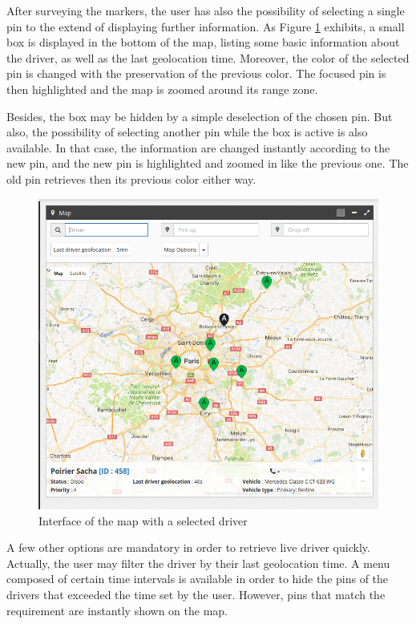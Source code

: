 After surveying the markers, the user has also the possibility of selecting a single pin to the extend of displaying further information. As Figure \ref{int7} exhibits, a small box is displayed in the bottom of the map, listing some basic information about the driver, as well as the last geolocation time. Moreover, the color of the selected pin is changed with the preservation of the previous color. The focused pin is then highlighted and the map is zoomed around its range zone. 

Besides, the box may be hidden by a simple deselection of the chosen pin. But also, the possibility of selecting another pin while the box is active is also available. In that case, the information are changed instantly according to the new pin, and the new pin is highlighted and zoomed in like the previous one.
The old pin retrieves then its previous color either way.

\begin{figure}[!htbp] 
\begin{center}
\includegraphics[width=5.8 in]{images/achievement/7.png}
\caption{Interface of the map with a selected driver}
\label{int7}
\end{center}
\end{figure}

\newpage


A few other options are mandatory in order to retrieve live driver quickly. Actually, the user may filter the driver by their last geolocation time. A menu composed of certain time intervals is available in order to hide the pins of the drivers that exceeded the time set by the user. However, pins that match the requirement are instantly shown on the map.

